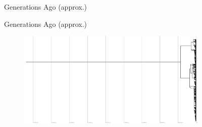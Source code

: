 \begin{figure}
  \begin{minipage}{0.5\columnwidth}
    \centering
    Generations Ago (approx.)
  \end{minipage}
  \hfill
  \begin{minipage}{0.5\columnwidth}
    \centering
    Generations Ago (approx.)
  \end{minipage}
  \begin{minipage}{0.5\columnwidth}
    \hspace{0.02\linewidth}
    \hfill
    \hfill
    \hfill
    \hfill
  \end{minipage}
  \hfill
  \begin{minipage}{0.5\columnwidth}
    \hspace{0.02\linewidth}
    \hfill
    \hfill
    \hfill
    \hfill
  \end{minipage}
  \hfill
  \begin{subfigure}[b]{0.5\columnwidth}
    \includegraphics[height=0.12\textheight,width=\textwidth]{img/perfect-tree-phylogenies-log/epoch=7+resolution=3+treatment=2.pdf}

\end{subfigure}
\end{figure}
